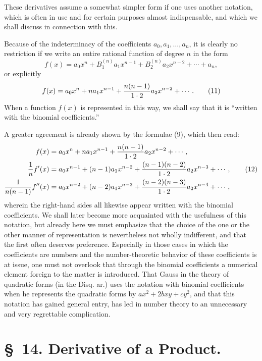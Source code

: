 \documentclass[11pt]{article}
\begin{document}
These derivatives assume a somewhat simpler form if one uses another notation, which is often in use and for certain purposes almost indispensable, and which we shall discuss in connection with this.

Because of the indeterminacy of the coefficients $a_0,a_1,\ldots,a_n$, it is clearly no restriction if we write an entire rational function of degree $n$ in the form
\begin{equation}
 f(x)=a_0x^n+B_1^{(n)}a_1x^{n-1}+B_2^{(n)}a_2x^{n-2}+\cdots+a_n,
\tag{10}
\end{equation}
or explicitly
\begin{equation}
 f(x)=a_0x^n+na_1x^{n-1}+{n(n-1)\over1\cdot2}a_2x^{n-2}+\cdots.
\tag{11}
\end{equation}
When a function $f(x)$ is represented in this way, we shall say that it is ``written with the binomial coefficients.''

A greater agreement is already shown by the formulae (9), which then read:
\begin{align}
 f(x)&=a_0x^n+na_1x^{n-1}+{n(n-1)\over1\cdot2}a_2x^{n-2}+\cdots,\notag\\
 {1\over n}f'(x)&=a_0x^{n-1}+(n-1)a_1x^{n-2}+{(n-1)(n-2)\over1\cdot2}a_2x^{n-3}+\cdots, \tag{12}\\
 {1\over n(n-1)}f''(x)&=a_0x^{n-2}+(n-2)a_1x^{n-3}+{(n-2)(n-3)\over1\cdot2}a_2x^{n-4}+\cdots,\notag
\end{align}
wherein the right-hand sides all likewise appear written with the binomial coefficients. We shall later become more acquainted with the usefulness of this notation, but already here we must emphasize that the choice of the one or the other manner of representation is nevertheless not wholly indifferent, and that the first often deserves preference. Especially in those cases in which the coefficients are numbers and the number-theoretic behavior of these coefficients is at issue, one must not overlook that through the binomial coefficients a numerical element foreign to the matter is introduced. That Gauss in the theory of quadratic forms (in the Disq. ar.) uses the notation with binomial coefficients when he represents the quadratic forms by $ax^2+2bxy+cy^2$, and that this notation has gained general entry, has led in number theory to an unnecessary and very regrettable complication.

\section*{\S~14. Derivative of a Product.}
\end{document}
